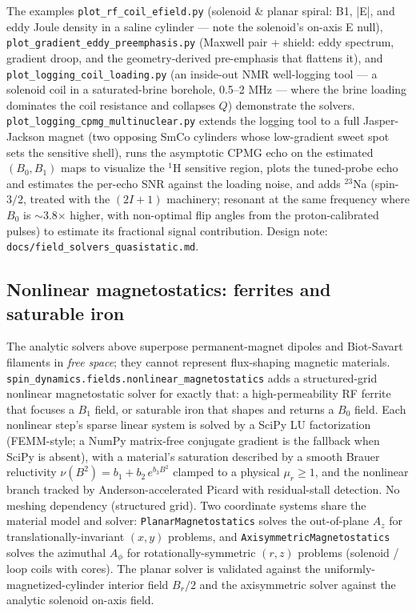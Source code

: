\documentclass[11pt,oneside]{report}
\newcommand{\code}[1]{\texttt{#1}}
\begin{document}
The examples \code{plot\_rf\_coil\_efield.py} (solenoid \& planar spiral: B1, |E|,
and eddy Joule density in a saline cylinder --- note the solenoid's on-axis E
null), \code{plot\_gradient\_eddy\_preemphasis.py} (Maxwell pair + shield: eddy
spectrum, gradient droop, and the geometry-derived pre-emphasis that flattens it),
and \code{plot\_logging\_coil\_loading.py} (an inside-out NMR well-logging tool ---
a solenoid coil in a saturated-brine borehole, 0.5--2 MHz --- where the brine
loading dominates the coil resistance and collapses \(Q\)) demonstrate the
solvers. \code{plot\_logging\_cpmg\_multinuclear.py} extends the logging tool to a
full Jasper-Jackson magnet (two opposing SmCo cylinders whose low-gradient
sweet spot sets the sensitive shell), runs the asymptotic CPMG echo on the
estimated \((B_0, B_1)\) maps to visualize the \(^1\)H sensitive region, plots the
tuned-probe echo and estimates the per-echo SNR against the loading noise, and
adds \(^{23}\)Na (spin-\(3/2\), treated with the \((2I+1)\) machinery; resonant at
the same frequency where \(B_0\) is \(\sim\)3.8\(\times\) higher, with non-optimal
flip angles from the proton-calibrated pulses) to estimate its fractional signal
contribution. Design note: \code{docs/field\_solvers\_quasistatic.md}.

\subsection{Nonlinear magnetostatics: ferrites and saturable iron}
\label{sec:fields-nonlinear-magnetostatics}

The analytic solvers above superpose permanent-magnet dipoles and Biot-Savart
filaments in \emph{free space}; they cannot represent flux-shaping magnetic
materials. \code{spin\_dynamics.fields.nonlinear\_magnetostatics} adds a
structured-grid nonlinear magnetostatic solver for exactly that: a
high-permeability RF ferrite that focuses a \(B_1\) field, or saturable iron that
shapes and returns a \(B_0\) field. Each nonlinear step's sparse linear system is
solved by a SciPy LU factorization (FEMM-style; a NumPy matrix-free conjugate
gradient is the fallback when SciPy is absent), with a material's saturation
described by a smooth Brauer reluctivity
\(\nu(B^2)=b_1+b_2\,e^{b_3 B^2}\) clamped to a physical \(\mu_r\ge 1\), and the
nonlinear branch tracked by Anderson-accelerated Picard with residual-stall
detection. No meshing dependency (structured grid).
Two coordinate systems share the material model and solver:
\code{PlanarMagnetostatics} solves the out-of-plane \(A_z\) for
translationally-invariant \((x,y)\) problems, and
\code{AxisymmetricMagnetostatics} solves the azimuthal \(A_\phi\) for
rotationally-symmetric \((r,z)\) problems (solenoid / loop coils with cores). The
planar solver is validated against the uniformly-magnetized-cylinder interior
field \(B_r/2\) and the axisymmetric solver against the analytic solenoid
on-axis field.
\end{document}
